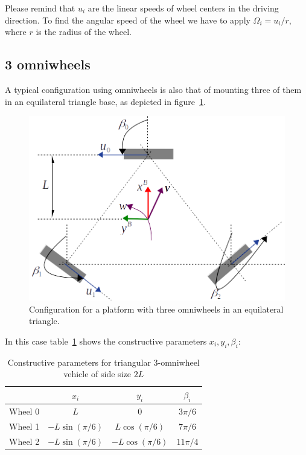 Please remind that $u_i$ are the linear speeds of wheel centers in the driving direction. To find the angular speed of the wheel we have to apply $\Omega_i = u_i/r$, where $r$ is the radius of the wheel. 


\subsection{3 omniwheels}
A typical configuration using omniwheels is also that of mounting three of them in an equilateral triangle base, as depicted in figure~\ref{fig:three_omniwheels_kinematics}.
\begin{figure}[bth!]
  \begin{center}
    \includegraphics[width=1.0\columnwidth]{figures/three_omniwheels_kinematics.png}
    \caption{Configuration for a platform with three omniwheels in an equilateral triangle.}
    \label{fig:three_omniwheels_kinematics}
  \end{center}
\end{figure}

In this case table~\ref{tab:params_3_omni} shows the constructive parameters  $x_i,y_i,\beta_i$: 
\begin{table}[hbt] \centering
\caption{Constructive parameters for triangular 3-omniwheel vehicle of side size $2L$}
\begin{tabular}
[c]{|c|c|c|c|}\hline
		& $x_i$ 		    & $y_i$				& $\beta_i$ \\\hline
Wheel 0 & $L$ 		        & $0$				& $3\pi/6$ \\\hline
Wheel 1 & $-L\sin(\pi/6)$   & $L\cos(\pi/6)$	& $7\pi/6$ \\\hline
Wheel 2 & $-L\sin(\pi/6)$ 	& $-L\cos(\pi/6)$	& $11\pi/4$ \\\hline
\end{tabular}
\label{tab:params_3_omni}
\end{table}


